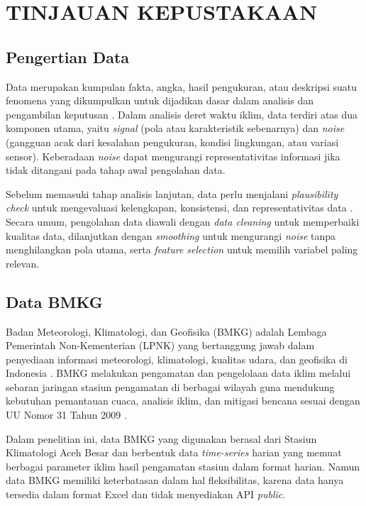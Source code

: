\chapter{TINJAUAN KEPUSTAKAAN}

\section{Pengertian Data}
Data merupakan kumpulan fakta, angka, hasil pengukuran, atau deskripsi suatu fenomena yang dikumpulkan untuk dijadikan dasar dalam analisis dan pengambilan keputusan \citep{akerkar2016}. Dalam analisis deret waktu iklim, data terdiri atas dua komponen utama, yaitu \textit{signal} (pola atau karakteristik sebenarnya) dan \textit{noise} (gangguan acak dari kesalahan pengukuran, kondisi lingkungan, atau variasi sensor). Keberadaan \textit{noise} dapat mengurangi representativitas informasi jika tidak ditangani pada tahap awal pengolahan data.

Sebelum memasuki tahap analisis lanjutan, data perlu menjalani \textit{plausibility check} untuk mengevaluasi kelengkapan, konsistensi, dan representativitas data \citep{berthold2020}. Secara umum, pengolahan data diawali dengan \textit{data cleaning} untuk memperbaiki kualitas data, dilanjutkan dengan \textit{smoothing} untuk mengurangi \textit{noise} tanpa menghilangkan pola utama, serta \textit{feature selection} untuk memilih variabel paling relevan.
\section{Data BMKG}
Badan Meteorologi, Klimatologi, dan Geofisika (BMKG) adalah Lembaga Pemerintah Non-Kementerian (LPNK) yang bertanggung jawab dalam penyediaan informasi meteorologi, klimatologi, kualitas udara, dan geofisika di Indonesia \citep{sujalu2020}. BMKG melakukan pengamatan dan pengelolaan data iklim melalui sebaran jaringan stasiun pengamatan di berbagai wilayah guna mendukung kebutuhan pemantauan cuaca, analisis iklim, dan mitigasi bencana sesuai dengan UU Nomor 31 Tahun 2009 \citep{saragih2024}.

Dalam penelitian ini, data BMKG yang digunakan berasal dari Stasiun Klimatologi Aceh Besar dan berbentuk data \textit{time-series} harian yang memuat berbagai parameter iklim hasil pengamatan stasiun dalam format harian. Namun data BMKG memiliki keterbatasan dalam hal fleksibilitas, karena data hanya tersedia dalam format Excel dan tidak menyediakan API \textit{public}.

